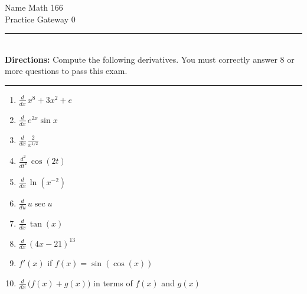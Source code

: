 \documentclass{article}
\begin{document}
\large
\noindent Name \underline{\hspace{2.5 in}}  \hfill Math 166\\
\hfill Practice Gateway 0
\pagestyle{empty}
\\
\hrule\ \\
{\bf Directions:} Compute the following derivatives.  You must correctly answer 8 or more questions to pass this exam.\\

\hrule
\vfill
\begin{enumerate}
\item $\displaystyle \frac{d}{dx}\, x^8 + 3x^2 + e$ \hfill \underline{\hspace{2 in}} \hspace{.5 in} \, 
\vfill
\item $\displaystyle \frac{d}{dx}\, e^{2x}\sin x$ \hfill \underline{\hspace{2 in}} \hspace{.5 in} \, 
\vfill
\item $\displaystyle \frac{d}{dx}\, \frac{2}{x^{1/2}}$ \hfill \underline{\hspace{2 in}} \hspace{.5 in} \, 
\vfill
\item $\displaystyle \frac{d^2}{dt^2}\, \cos(2t)$ \hfill \underline{\hspace{2 in}} \hspace{.5 in} \, 
\vfill
\item $\displaystyle \frac{d}{dx}\, \ln(x^{-2})$ \hfill \underline{\hspace{2 in}} \hspace{.5 in} \, 
\vfill
\item $\displaystyle \frac{d}{du}\, u \sec u$ \hfill \underline{\hspace{2 in}} \hspace{.5 in} \, 
\vfill
\item $\displaystyle \frac{d}{dx}\,\tan(x)$ \hfill \underline{\hspace{2 in}} \hspace{.5 in} \, 
\vfill
\item $\displaystyle \frac{d}{dx}\, (4x - 21)^{13}$ \hfill \underline{\hspace{2 in}} \hspace{.5 in} \, 
\vfill
\item $f'(x)$ if $f(x) = \sin(\cos(x))$ \hfill \underline{\hspace{2 in}} \hspace{.5 in} \, 
\vfill
\item $\displaystyle \frac{d}{dx}\, \bigg(f(x) + g(x)\bigg)$ in terms of $f(x)$ and $g(x)$ \hfill \underline{\hspace{2 in}} \hspace{.5 in} \, 
\vfill
\end{enumerate}
\end{document}
